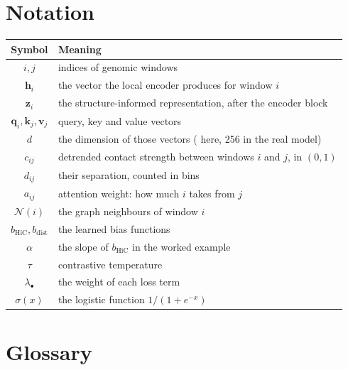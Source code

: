 \documentclass[11pt,a4paper]{article}
\newcommand{\hvec}[1]{\mathbf{h}_{#1}}
\newcommand{\zvec}[1]{\mathbf{z}_{#1}}
\newcommand{\qvec}[1]{\mathbf{q}_{#1}}
\newcommand{\kvec}[1]{\mathbf{k}_{#1}}
\newcommand{\vvec}[1]{\mathbf{v}_{#1}}
\begin{document}
\section{Notation}

\begin{center}
\renewcommand{\arraystretch}{1.3}
\begin{tabular}{@{}c l@{}}
\toprule
\textbf{Symbol} & \textbf{Meaning}\\
\midrule
$i, j$ & indices of genomic windows\\
$\hvec{i}$ & the vector the local encoder produces for window $i$\\
$\zvec{i}$ & the structure-informed representation, after the encoder block\\
$\qvec{i}, \kvec{j}, \vvec{j}$ & query, key and value vectors\\
$d$ & the dimension of those vectors (\WEdim{} here, 256 in the real model)\\
$c_{ij}$ & detrended contact strength between windows $i$ and $j$, in $(0,1)$\\
$d_{ij}$ & their separation, counted in bins\\
$a_{ij}$ & attention weight: how much $i$ takes from $j$\\
$\mathcal{N}(i)$ & the graph neighbours of window $i$\\
$b_{\mathrm{HiC}}, b_{\mathrm{dist}}$ & the learned bias functions\\
$\alpha$ & the slope of $b_{\mathrm{HiC}}$ in the worked example\\
$\tau$ & contrastive temperature\\
$\lambda_\bullet$ & the weight of each loss term\\
$\sigma(x)$ & the logistic function $1/(1+e^{-x})$\\
\bottomrule
\end{tabular}
\end{center}

\section{Glossary}
\end{document}
